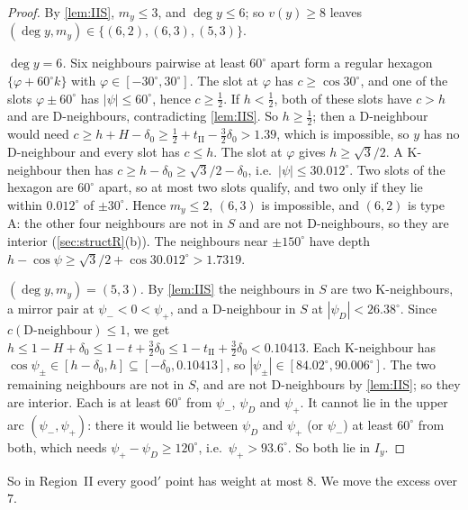 \begin{proof}
By \cref{lem:IIS}, $m_y\le3$, and $\deg y\le6$; so $v(y)\ge8$ leaves $(\deg y,m_y)\in\{(6,2),(6,3),(5,3)\}$.

\emph{$\deg y=6$.} Six neighbours pairwise at least $60^\circ$ apart form a regular hexagon $\{\varphi+60^\circ k\}$ with $\varphi\in[-30^\circ,30^\circ]$. The slot at $\varphi$ has $c\ge\cos30^\circ$, and one of the slots $\varphi\pm60^\circ$ has $|\psi|\le60^\circ$, hence $c\ge\frac12$. If $h<\frac12$, both of these slots have $c>h$ and are D-neighbours, contradicting \cref{lem:IIS}. So $h\ge\frac12$; then a D-neighbour would need $c\ge h+H-\delta_0\ge\frac12+t_{\mathrm{II}}-\frac32\delta_0>1.39$, which is impossible, so $y$ has no D-neighbour and every slot has $c\le h$. The slot at $\varphi$ gives $h\ge\sqrt3/2$. A K-neighbour then has $c\ge h-\delta_0\ge\sqrt3/2-\delta_0$, i.e.\ $|\psi|\le30.012^\circ$. Two slots of the hexagon are $60^\circ$ apart, so at most two slots qualify, and two only if they lie within $0.012^\circ$ of $\pm30^\circ$. Hence $m_y\le2$, $(6,3)$ is impossible, and $(6,2)$ is type A: the other four neighbours are not in $S$ and are not D-neighbours, so they are interior (\cref{sec:structR}(b)). The neighbours near $\pm150^\circ$ have depth $h-\cos\psi\ge\sqrt3/2+\cos30.012^\circ>1.7319$.

\emph{$(\deg y,m_y)=(5,3)$.} By \cref{lem:IIS} the neighbours in $S$ are two K-neighbours, a mirror pair at $\psi_-<0<\psi_+$, and a D-neighbour in $S$ at $|\psi_D|<26.38^\circ$. Since $c(\text{D-neighbour})\le1$, we get $h\le1-H+\delta_0\le1-t+\frac32\delta_0\le1-t_{\mathrm{II}}+\frac32\delta_0<0.10413$. Each K-neighbour has $\cos\psi_\pm\in[h-\delta_0,h]\subseteq[-\delta_0,0.10413]$, so $|\psi_\pm|\in[84.02^\circ,90.006^\circ]$. The two remaining neighbours are not in $S$, and are not D-neighbours by \cref{lem:IIS}; so they are interior. Each is at least $60^\circ$ from $\psi_-$, $\psi_D$ and $\psi_+$. It cannot lie in the upper arc $(\psi_-,\psi_+)$: there it would lie between $\psi_D$ and $\psi_+$ (or $\psi_-$) at least $60^\circ$ from both, which needs $\psi_+-\psi_D\ge120^\circ$, i.e.\ $\psi_+>93.6^\circ$. So both lie in $I_y$.
\end{proof}

So in Region~II every good$'$ point has weight at most $8$. We move the excess over $7$.

